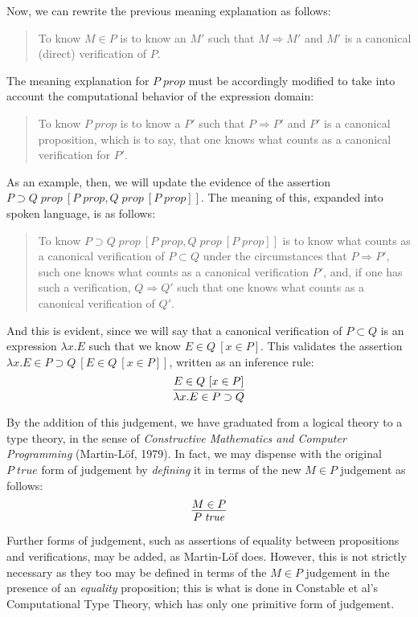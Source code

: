 \documentclass{amsart}
\theoremstyle{definition}
\theoremstyle{remark}
\numberwithin{equation}{section}
\newcommand\isprop[1]{\ensuremath{#1\;\mathit{prop}}}
\newcommand\istrue[1]{\ensuremath{#1\;\mathit{true}}}
\newcommand\hyp[2]{\ensuremath{#1\ [#2]}}
\newcommand\ver[2]{\ensuremath{#1\in#2}}
\newcommand\reduce[2]{\ensuremath{#1\Rightarrow#2}}
\begin{document}
Now, we can rewrite the previous meaning explanation as follows:
\begin{quote}
  To know \ver{M}{P} is to know an $M'$ such that \reduce{M}{M'} and $M'$ is a
  canonical (direct) verification of $P$.
\end{quote}

The meaning explanation for \isprop{P} must be accordingly modified to take
into account the computational behavior of the expression domain:
\begin{quote}
  To know \isprop{P} is to know a $P'$ such that \reduce{P}{P'} and $P'$ is a
  canonical proposition, which is to say, that one knows what counts as a
  canonical verification for $P'$.
\end{quote}

As an example, then, we will update the evidence of the assertion
\hyp{\isprop{P\supset Q}}{\isprop{P},\hyp{\isprop{Q}}{\isprop{P}}}. The meaning
of this, expanded into spoken language, is as follows:
\begin{quote}
  To know \hyp{\isprop{P\supset Q}}{\isprop{P},\hyp{\isprop{Q}}{\isprop{P}}} is
  to know what counts as a canonical verification of $P\subset Q$ under
  the circumstances that \reduce{P}{P'}, such one knows what counts as a
  canonical verification $P'$, and, if one has such a verification,
  \reduce{Q}{Q'} such that one knows what counts as a canonical verification of
  $Q'$.
\end{quote}

And this is evident, since we will say that a canonical verification of
$P\subset Q$ is an expression $\lambda x. E$ such that we know
\hyp{\ver{E}{Q}}{\ver{x}{P}}. This validates the assertion \hyp{\ver{\lambda
x.E}{P\supset Q}}{\hyp{\ver{E}{Q}}{\ver{x}{P}}}, written as an inference rule:
\[
  \infer{
    \ver{\lambda x.E}{P\supset Q}
  }{
    \hyp{\ver{E}{Q}}{\ver{x}{P}}
  }
\]

By the addition of this judgement, we have graduated from a logical theory to a
type theory, in the sense of \emph{Constructive Mathematics and Computer
Programming} (Martin-L\"of, 1979). In fact, we may dispense with the original
\istrue{P} form of judgement by \emph{defining} it in terms of the new
\ver{M}{P} judgement as follows:
\[
  \infer{
    \istrue{P}
  }{
    \ver{M}{P}
  }
\]

Further forms of judgement, such as assertions of equality between propositions
and verifications, may be added, as Martin-L\"of does. However, this is not
strictly necessary as they too may be defined in terms of the $\ver{M}{P}$
judgement in the presence of an \emph{equality} proposition; this is what is
done in Constable et al's Computational Type Theory, which has only one
primitive form of judgement.
\end{document}
